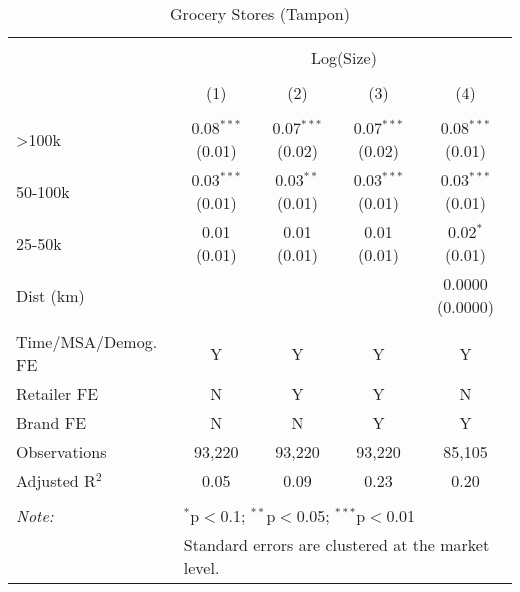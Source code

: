 
\begin{table}[!htbp] \centering 
  \caption{Grocery Stores (Tampon)} 
  \label{tab:packageSizeGroceryTampon} 
\begin{tabular}{@{\extracolsep{5pt}}lcccc} 
\\[-1.8ex]\hline 
\hline \\[-1.8ex] 
 & \multicolumn{4}{c}{Log(Size)} \\ 
\\[-1.8ex] & (1) & (2) & (3) & (4)\\ 
\hline \\[-1.8ex] 
 >100k & 0.08$^{***}$ (0.01) & 0.07$^{***}$ (0.02) & 0.07$^{***}$ (0.02) & 0.08$^{***}$ (0.01) \\ 
  50-100k & 0.03$^{***}$ (0.01) & 0.03$^{**}$ (0.01) & 0.03$^{***}$ (0.01) & 0.03$^{***}$ (0.01) \\ 
  25-50k & 0.01 (0.01) & 0.01 (0.01) & 0.01 (0.01) & 0.02$^{*}$ (0.01) \\ 
  Dist (km) &  &  &  & 0.0000 (0.0000) \\ 
 \hline \\[-1.8ex] 
Time/MSA/Demog. FE & Y & Y & Y & Y \\ 
Retailer FE & N & Y & Y & N \\ 
Brand FE & N & N & Y & Y \\ 
Observations & 93,220 & 93,220 & 93,220 & 85,105 \\ 
Adjusted R$^{2}$ & 0.05 & 0.09 & 0.23 & 0.20 \\ 
\hline 
\hline \\[-1.8ex] 
\textit{Note:}  & \multicolumn{4}{l}{$^{*}$p$<$0.1; $^{**}$p$<$0.05; $^{***}$p$<$0.01} \\ 
 & \multicolumn{4}{l}{Standard errors are clustered at the market level.} \\ 
\end{tabular} 
\end{table} 
